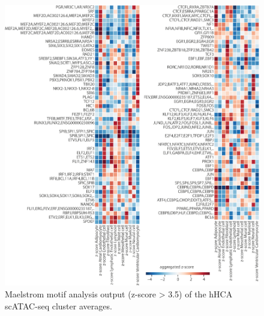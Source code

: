 \begin{figure}
    \centering
    \includegraphics[width=\linewidth]{ch.scepia/imgs/Maelstrom_AllHitsAbove3.5_Myriad_SuppFigMaelstromHM.png}
    \caption{Maelstrom motif analysis output (z-score > 3.5) of the hHCA scATAC-seq cluster averages.}
    \label{fig:scepia_maelstromhm}
\end{figure}

